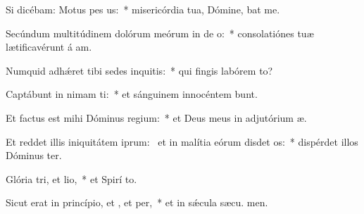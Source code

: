 \item Si dicébam: Motus  pes us:~* misericórdia tua, Dómine, bat me.
\item Secúndum multitúdinem dolórum meórum in de o:~* consolatiónes tuæ lætificavérunt á am.
\item Numquid adhǽret tibi sedes inquitis:~* qui fingis labórem  to?
\item Captábunt in nimam ti:~* et sánguinem innocéntem bunt.
\item Et factus est mihi Dóminus  regium:~* et Deus meus in adjutórium  æ.
\item Et reddet illis iniquitátem iprum:~\pscross{} et in malítia eórum disdet os:~* dispérdet illos Dóminus  ter.
\item Glória tri, et lio,~* et Spirí to.
\item Sicut erat in princípio, et , et per,~* et in sǽcula sæcu. men.
